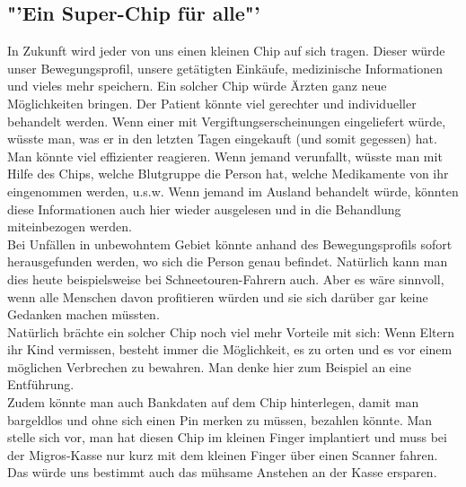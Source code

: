 \subsection*{"'Ein Super-Chip für alle"'}
In Zukunft wird jeder von uns einen kleinen Chip auf 
sich tragen. Dieser würde unser Bewegungsprofil, unsere getätigten 
Einkäufe, medizinische Informationen und vieles mehr speichern. Ein 
solcher Chip würde Ärzten ganz neue Möglichkeiten bringen. 
Der Patient k\"onnte viel gerechter und individueller behandelt werden. Wenn 
einer mit Vergiftungserscheinungen eingeliefert würde, wüsste man, was 
er in den letzten Tagen eingekauft (und somit gegessen) hat. Man 
könnte viel effizienter reagieren. Wenn jemand verunfallt, wüsste man 
mit Hilfe des Chips, welche Blutgruppe die Person hat, welche 
Medikamente von ihr eingenommen werden, u.s.w. Wenn jemand im Ausland 
behandelt würde, könnten diese Informationen auch hier wieder 
ausgelesen und in die Behandlung miteinbezogen werden.\\
Bei Unfällen in unbewohntem Gebiet könnte anhand des Bewegungsprofils 
sofort herausgefunden werden, wo sich die Person genau befindet. 
Natürlich kann man dies heute beispielsweise bei Schneetouren-Fahrern 
auch. Aber es wäre sinnvoll, wenn alle Menschen davon profitieren 
würden und sie sich darüber gar keine Gedanken machen müssten.\\
Natürlich brächte ein solcher Chip noch viel mehr Vorteile mit sich: 
Wenn Eltern ihr Kind vermissen, besteht immer die Möglichkeit, es zu 
orten und es vor einem möglichen Verbrechen zu bewahren. Man denke hier 
zum Beispiel an eine Entführung. \\
Zudem könnte man auch Bankdaten auf dem Chip hinterlegen, damit man 
bargeldlos und ohne sich einen Pin merken zu müssen, bezahlen könnte. 
Man stelle sich vor, man hat diesen Chip im kleinen Finger implantiert 
und muss bei der Migros-Kasse nur kurz mit dem kleinen Finger über 
einen Scanner fahren. Das würde uns bestimmt auch das mühsame Anstehen 
an der Kasse ersparen.

